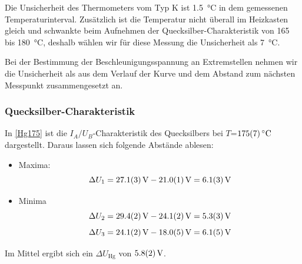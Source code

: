 \documentclass[
	a4paper,
	12pt,
	pagesize,
	ngerman
]{scrartcl}
\begin{document}
	Die Unsicherheit des Thermometers vom Typ K ist \SI{1,5}{\degreeCelsius} in dem gemessenen Temperaturinterval.\cite{DIN} 
	Zusätzlich ist die Temperatur nicht überall im Heizkasten gleich und schwankte beim Aufnehmen der Quecksilber-Charakteristik von 165 bis \SI{180}{\degreeCelsius}, deshalb wählen wir für diese Messung die Unsicherheit als \SI{7}{\degreeCelsius}.
	
	Bei der Bestimmung der Beschleunigungsspannung an Extremstellen nehmen wir die Unsicherheit als aus dem Verlauf der Kurve und dem Abstand zum nächsten Messpunkt zusammengesetzt an.
	
	\subsubsection{Quecksilber-Charakteristik}
	In \cref{Hg175} ist die $I_A/U_B$-Charakteristik des Quecksilbers bei $T$=$\SI{175 +- 7}{\degreeCelsius}$ dargestellt. Daraus lassen sich folgende Abstände ablesen:
	\begin{itemize}
		\item Maxima:
		\begin{equation*}
			\Delta{U}_1 = \SI{27,1 +- 0,3}{V} -\SI{21 +- 0,1}{V} = \SI{6,1 +- 0,3}{V}
		\end{equation*}
		\item Minima
		\begin{equation*}\Delta{U}_2 = \SI{29,4 +- 0,2}{V} -\SI{24,1 +- 0,2}{V} = \SI{5,3 +- 0,3}{V}\end{equation*}
		\begin{equation*}\Delta{U}_3 = \SI{24,1 +- 0,2}{V}- \SI{18,0 +- 0,5}{V} = \SI{6,1 +- 0,5}{V}\end{equation*}
	\end{itemize}
	Im Mittel ergibt sich ein $\Delta{U_\text{Hg}}$ von $\SI{5,8 +- 0,2}{V}$.
	
\end{document}
